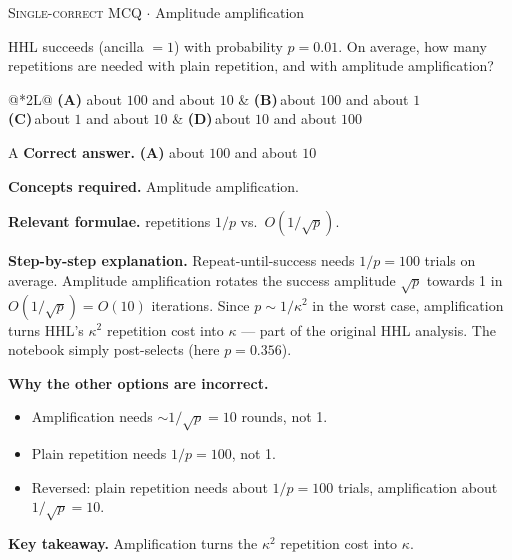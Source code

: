 \documentclass[11pt,a4paper]{article}
\newcommand{\optlabel}[1]{\textbf{(#1)}}
\newcommand{\correctlabel}[1]{\textcolor{okgreen}{\textbf{(#1)}\,\ding{51}}}
\newenvironment{qitem}[1]{\begin{list}{}{\setlength{\leftmargin}{3.3em}\setlength{\labelwidth}{3.1em}%
  \setlength{\labelsep}{0.2em}\setlength{\topsep}{3pt}\setlength{\parsep}{3pt}}\item[\textbf{Q.#1}\hfill]}{\end{list}}
\newcommand{\qsep}{\par\vspace{2pt}{\color{black!15}\hrule}\vspace{4pt}}
\newcommand{\qmeta}[2]{{\footnotesize\color{black!60}\textsc{#1} \;$\cdot$\; #2}\par}
\begin{document}
\begin{qitem}{62}
\qmeta{Single-correct MCQ}{Amplitude amplification}
HHL succeeds (ancilla $= 1$) with probability $p = 0.01$. On average, how many repetitions are needed with plain repetition, and with amplitude amplification?
\par\smallskip\noindent\begin{tabularx}{\linewidth}{@{}*{2}{L}@{}}
\correctlabel{A}\,about $100$ and about $10$ & \optlabel{B}\,about $100$ and about $1$ \\[3pt]
\optlabel{C}\,about $1$ and about $10$ & \optlabel{D}\,about $10$ and about $100$
\end{tabularx}
\end{qitem}
\begin{solbox}{A}
\textbf{\color{brand}Correct answer.} \textcolor{okgreen}{\textbf{(A)}} about $100$ and about $10$

\textbf{\color{brand}Concepts required.} Amplitude amplification.

\textbf{\color{brand}Relevant formulae.} repetitions $1/p$ vs.\ $O(1/\sqrt p)$.

\textbf{\color{brand}Step-by-step explanation.} Repeat-until-success needs $1/p = 100$ trials on average. Amplitude amplification rotates the success amplitude $\sqrt p$ towards 1 in $O(1/\sqrt p) = O(10)$ iterations. Since
$p \sim 1/\kappa^2$ in the worst case, amplification turns HHL's $\kappa^2$ repetition cost into $\kappa$ --- part of the original HHL analysis. The notebook simply post-selects (here $p = 0.356$).

\textbf{\color{brand}Why the other options are incorrect.}
\begin{itemize}[leftmargin=2.4em, itemsep=1pt, topsep=2pt]
\item[\textbf{(B)}] Amplification needs $\sim1/\sqrt p = 10$ rounds, not 1.
\item[\textbf{(C)}] Plain repetition needs $1/p = 100$, not 1.
\item[\textbf{(D)}] Reversed: plain repetition needs about $1/p = 100$ trials, amplification about $1/\sqrt p = 10$.
\end{itemize}
\textbf{\color{brand}Key takeaway.} Amplification turns the $\kappa^2$ repetition cost into $\kappa$.
\end{solbox}
\qsep
\end{document}
